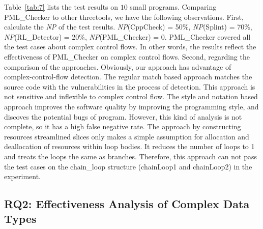 Table~\ref{tab:7} lists the test results on $10$ small programs. Comparing PML\_Checker to other threetools, we have the following observations.
First, calculate the \textit{NP} of the test results. \textit{NP}(CppCheck) = 50\%, \textit{NP}(Splint) = 70\%, \textit{NP}(RL\_Detector) = 20\%, \textit{NP}(PML\_Checker) = 0. PML\_Checker covered all the test cases about complex control flows. In other words, the results reflect the effectiveness of PML\_Checker on complex control flows.
Second, regarding the comparison of the approaches. Obviously, our approach has advantage of complex-control-flow detection. The regular match based approach matches the source code with the vulnerabilities in the process of detection. This approach is not sensitive and inflexible to complex control flow. The style and notation based approach improves the software quality by improving the programming style, and discoves the potential bugs of program. However, this kind of analysis is not complete, so it has a high false negative rate. The approach by constructing resources streamlined slices only makes a simple assumption for allocation and deallocation of resources within loop bodies. It reduces the number of loops to 1 and treats the loops the same as branches. Therefore, this approach can not pass the test cases on the chain\_loop structure (chainLoop1 and chainLoop2) in the experiment. \\


\subsection{RQ2: Effectiveness Analysis of Complex Data Types}

